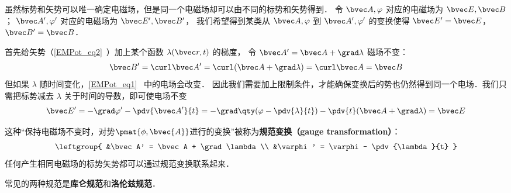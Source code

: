 
\begin{issues}
\issueDraft
\end{issues}


虽然标势和矢势可以唯一确定电磁场，但是同一个电磁场却可以由不同的标势和矢势得到． 令 $\bvec A, \varphi$ 对应的电磁场为 $\bvec E, \bvec B$； $\bvec A', \varphi'$ 对应的电磁场为 $\bvec E', \bvec B'$， 我们希望得到某类从 $\bvec A, \varphi$ 到 $\bvec A', \varphi'$ 的变换使得 $\bvec E' = \bvec E$， $\bvec B' = \bvec B$．

首先给矢势（\autoref{EMPot_eq2}~）加上某个函数 $\lambda(\bvec r, t)$ 的梯度， 令 $\bvec A' = \bvec A + \grad\lambda$ 磁场不变：
\begin{equation}
\bvec B' = \curl \bvec A' = \curl (\bvec A + \grad \lambda) = \curl \bvec A = \bvec B
\end{equation}
但如果 $\lambda$ 随时间变化，\autoref{EMPot_eq1}~ 中的电场会改变． 因此我们需要加上限制条件，才能确保变换后的势也仍然得到同一个电场．我们只需把标势减去 $\lambda$ 关于时间的导数，即可使电场不变
\begin{equation}
\bvec E' = -\grad \varphi' - \pdv{\bvec A'}{t} = -\grad \qty(\varphi - \pdv{\lambda}{t}) - \pdv{t} (\bvec A + \grad \lambda) = \bvec E
\end{equation}


这种“保持电磁场不变时，对势$\pmat{\phi, \bvec{A}}$进行的变换”被称为\textbf{规范变换（gauge transformation）}：
\begin{equation}\label{Gauge_eq3}
\leftgroup{
&\bvec A' = \bvec A + \grad \lambda\\
&\varphi' = \varphi - \pdv{\lambda}{t}
}\end{equation}
任何产生相同电磁场的标势矢势都可以通过规范变换联系起来．

常见的两种规范是\textbf{库仑规范}和\textbf{洛伦兹规范}．
